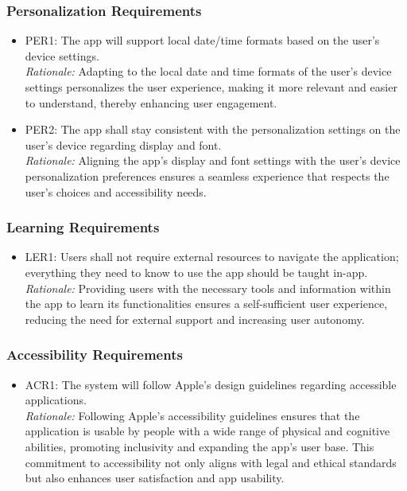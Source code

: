 \documentclass[12pt]{article}
\begin{document}
\subsubsection{Personalization Requirements}
\begin{itemize}
\item PER1: The app will support local date/time formats based on the user’s device settings.\\
\textit{Rationale:} Adapting to the local date and time formats of the user's device settings personalizes the user experience, making it more relevant and easier to understand, thereby enhancing user engagement.
\item PER2: The app shall stay consistent with the personalization settings on the user’s device regarding display and font.\\
\textit{Rationale:} Aligning the app’s display and font settings with the user’s device personalization preferences ensures a seamless experience that respects the user's choices and accessibility needs.
\end{itemize}

\subsubsection{Learning Requirements}
\begin{itemize}
\item LER1: Users shall not require external resources to navigate the application; everything they need to know to use the app should be taught in-app.\\
\textit{Rationale:} Providing users with the necessary tools and information within the app to learn its functionalities ensures a self-sufficient user experience, reducing the need for external support and increasing user autonomy.
\end{itemize}

\subsubsection{Accessibility Requirements}
\begin{itemize}
\item ACR1: The system will follow Apple’s design guidelines regarding accessible applications.\\
\textit{Rationale:} Following Apple’s accessibility guidelines ensures that the application is usable by people with a wide range of physical and cognitive abilities, promoting inclusivity and expanding the app's user base. This commitment to accessibility not only aligns with legal and ethical standards but also enhances user satisfaction and app usability.
\end{itemize}
\end{document}
